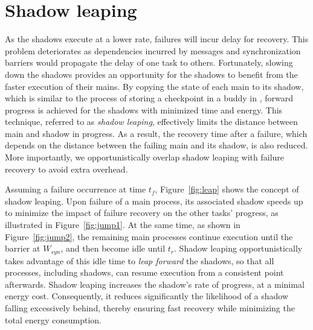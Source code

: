 \section{Shadow leaping}
\label{sec:leaping_shadows}

As the shadows execute at a lower rate, failures will incur delay for recovery. This problem deteriorates as dependencies incurred by messages and synchronization barriers would propagate the delay of one task to others.  
Fortunately, slowing down the shadows provides an opportunity for the shadows to benefit from the faster execution of their mains. By copying the state of each main to its shadow, which is similar to the process of storing a checkpoint in a buddy in \cite{zheng_2004_ftccharm}, forward progress is achieved for the shadows with minimized time and energy. This technique, referred to as \textit{shadow leaping}, effectively limits the distance between main and shadow in progress. 
As a result, the recovery time after a failure, which depends on the distance between the failing main 
and its shadow, is also reduced. 
More importantly, 
we opportunistically overlap shadow leaping with failure recovery to avoid extra overhead. 

Assuming a failure occurrence at time $t_f$, Figure~\ref{fig:leap} shows the concept of shadow leaping. 
Upon failure of a main process, its associated shadow speeds up to minimize the impact of failure recovery on the other tasks' progress, as illustrated in Figure~\ref{fig:jump1}. 
At the same time, as shown in Figure~\ref{fig:jump2}, the remaining main processes continue execution until the barrier at $W_{syn}$, and then become idle until $t_r$. 
Shadow leaping opportunistically takes advantage of this idle time to {\it leap forward} the shadows, so that  
all processes, including shadows, can resume execution from a consistent point afterwards. 
Shadow leaping increases the shadow's rate of progress, at a minimal energy cost. Consequently, it reduces significantly the likelihood of a shadow falling excessively behind, thereby ensuring fast recovery while minimizing the total energy consumption.

